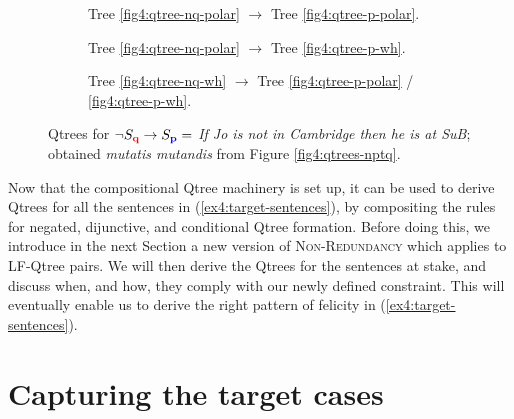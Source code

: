 \begin{figure}[H]\setlength{\fboxsep}{2pt}
	\centering
	\begin{subfigure}[b]{.31\linewidth}
		\centering
		\caption[]{Tree \ref{fig4:qtree-nq-polar} $\rightarrow$ Tree \ref{fig4:qtree-p-polar}.}\label{fig4:qtree-nqtp-polar-polar}
	\end{subfigure}\hfill
	\begin{subfigure}[b]{.31\linewidth}
		\centering
		\caption[]{Tree \ref{fig4:qtree-nq-polar} $\rightarrow$ Tree \ref{fig4:qtree-p-wh}.}\label{fig4:qtree-nqtp-polar-wh}
	\end{subfigure}\hfill
	\begin{subfigure}[b]{.31\linewidth}
		\centering
		\scalebox{1}{
			\begin{forest}
				[CS [{$\q$}][\fbox{$\p$}][\dbox{$\r$}][\dbox{...}]]
			\end{forest}
		}
		\caption[]{Tree \ref{fig4:qtree-nq-wh} $\rightarrow$ Tree \ref{fig4:qtree-p-polar} / \ref{fig4:qtree-p-wh}.}\label{fig4:qtree-nqtp-wh}
	\end{subfigure}
	\caption[]{Qtrees for $\neg S\protect_{\textbf{\textcolor{red}{q}}} \rightarrow S\protect_{\textbf{\textcolor{blue}{p}}} =$ \textit{If Jo is not in Cambridge then he is at SuB}; obtained \textit{mutatis mutandis} from Figure \ref{fig4:qtrees-nptq}.}
	\label{fig4:qtrees-nqtp}
\end{figure}

Now that the compositional Qtree machinery is set up, it can be used to derive Qtrees for all the sentences in (\ref{ex4:target-sentences}), by compositing the rules for negated, dijunctive, and conditional Qtree formation. Before doing this, we introduce in the next Section a new version of \textsc{Non-Redundancy} which applies to LF-Qtree pairs. We will then derive the Qtrees for the sentences at stake, and discuss when, and how, they comply with our newly defined constraint. This will eventually enable us to derive the right pattern of felicity in (\ref{ex4:target-sentences}).


\section{Capturing the target cases}\label{sec4:Q-Non-Redundancy}


